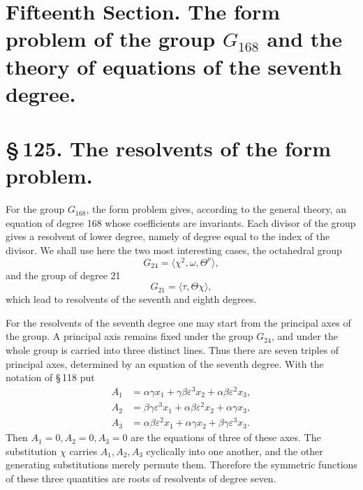 \documentclass[11pt]{article}
\newcommand{\eps}{\varepsilon}
\begin{document}
\section*{Fifteenth Section. The form problem of the group \(G_{168}\) and the theory of equations of the seventh degree.}

\section*{\S\,125. The resolvents of the form problem.}

For the group \(G_{168}\), the form problem gives, according to the general theory, an equation of degree 168 whose coefficients are invariants. Each divisor of the group gives a resolvent of lower degree, namely of degree equal to the index of the divisor. We shall use here the two most interesting cases, the octahedral group
\begin{equation}
G_{24}=\langle \chi^2,\omega,\Theta^\nu\rangle,
\tag{1}
\end{equation}
and the group of degree 21
\begin{equation}
G_{21}=\langle \tau,\Theta\chi\rangle,
\tag{2}
\end{equation}
which lead to resolvents of the seventh and eighth degrees.

For the resolvents of the seventh degree one may start from the principal axes of the group. A principal axis remains fixed under the group \(G_{24}\), and under the whole group is carried into three distinct lines. Thus there are seven triples of principal axes, determined by an equation of the seventh degree. With the notation of \S\,118 put
\begin{equation}
\begin{aligned}
A_1&=\alpha\gamma x_1+\gamma\beta\eps^3x_2+\alpha\beta\eps^2x_3,\\
A_2&=\beta\gamma\eps^3x_1+\alpha\beta\eps^2x_2+\alpha\gamma x_3,\\
A_3&=\alpha\beta\eps^2x_1+\alpha\gamma x_2+\beta\gamma\eps^3x_3.
\end{aligned}
\tag{3}
\end{equation}
Then \(A_1=0,A_2=0,A_3=0\) are the equations of three of these axes. The substitution \(\chi\) carries \(A_1,A_2,A_3\) cyclically into one another, and the other generating substitutions merely permute them. Therefore the symmetric functions of these three quantities are roots of resolvents of degree seven.
\end{document}
